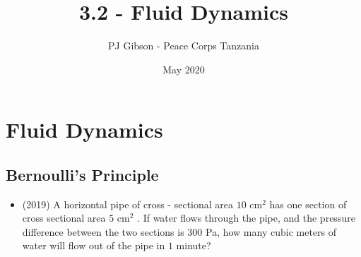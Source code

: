 \documentclass{article}
\title{3.2 - Fluid Dynamics}
\author{PJ Gibson - Peace Corps Tanzania}
\date{May 2020}
\begin{document}
\maketitle


\section{Fluid Dynamics}

\subsection{Bernoulli's Principle}
\begin{itemize}
\item (2019)  A horizontal pipe of cross - sectional area $ 10 $ cm$ ^{2}$ has one section of cross sectional area $ 5 $ cm$ ^{2}$ . If water flows through the pipe, and the pressure difference between the two sections is $ 300$ Pa, how many cubic meters of water will flow out of the pipe in $ 1$ minute?
\end{itemize}
\end{document}
